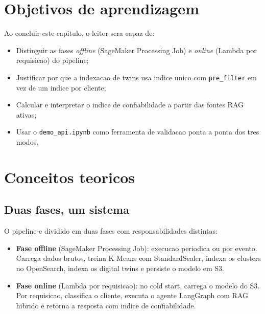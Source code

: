 \section{Objetivos de aprendizagem}

Ao concluir este capitulo, o leitor sera capaz de:

\begin{itemize}[leftmargin=*]
  \item Distinguir as fases \textit{offline} (SageMaker Processing Job)
        e \textit{online} (Lambda por requisicao) do pipeline;
  \item Justificar por que a indexacao de twins usa indice unico com
        \texttt{pre\_filter} em vez de um indice por cliente;
  \item Calcular e interpretar o indice de confiabilidade a partir das
        fontes RAG ativas;
  \item Usar o \texttt{demo\_api.ipynb} como ferramenta de validacao
        ponta a ponta dos tres modos.
\end{itemize}

\section{Conceitos teoricos}

\subsection{Duas fases, um sistema}

O pipeline e dividido em duas fases com responsabilidades distintas:

\begin{itemize}[leftmargin=*]
  \item \textbf{Fase offline} (SageMaker Processing Job): execucao
        periodica ou por evento. Carrega dados brutos, treina
        K-Means com StandardScaler,
        indexa os clusters no OpenSearch, indexa os
        digital twins e persiste o modelo em S3.
  \item \textbf{Fase online} (Lambda por requisicao):
        no cold start, carrega o modelo do S3. Por requisicao, classifica
        o cliente, executa o agente LangGraph com RAG
        hibrido e retorna a resposta com indice de confiabilidade.
\end{itemize}

